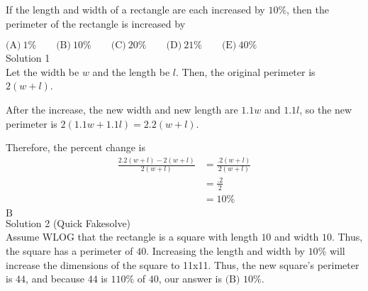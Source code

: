 

If the length and width of a rectangle are each increased by $10\%$, then the perimeter of the rectangle is increased by

$\text{(A)}\ 1\% \qquad \text{(B)}\ 10\% \qquad \text{(C)}\ 20\% \qquad \text{(D)}\ 21\% \qquad \text{(E)}\ 40\%$
\\
Solution 1
\\
Let the width be $w$ and the length be $l$. Then, the original perimeter is $2(w+l)$.

After the increase, the new width and new length are $1.1w$ and $1.1l$, so the new perimeter is $2(1.1w+1.1l)=2.2(w+l)$.

Therefore, the percent change is \begin{align*} \frac{2.2(w+l)-2(w+l)}{2(w+l)} &= \frac{.2(w+l)}{2(w+l)} \\ &= \frac{.2}{2} \\ &= 10\% \\ \end{align*}
$\boxed{\text{B}}$
\\
Solution 2 (Quick Fakesolve)
\\
Assume WLOG that the rectangle is a square with length $10$ and width $10$. Thus, the square has a perimeter of $40$. Increasing the length and width by $10\%$ will increase the dimensions of the square to 11x11. Thus, the new square's perimeter is $44$, and because $44$ is $110\%$ of $40$, our answer is $\boxed{\text{(B) } 10\%}$.
